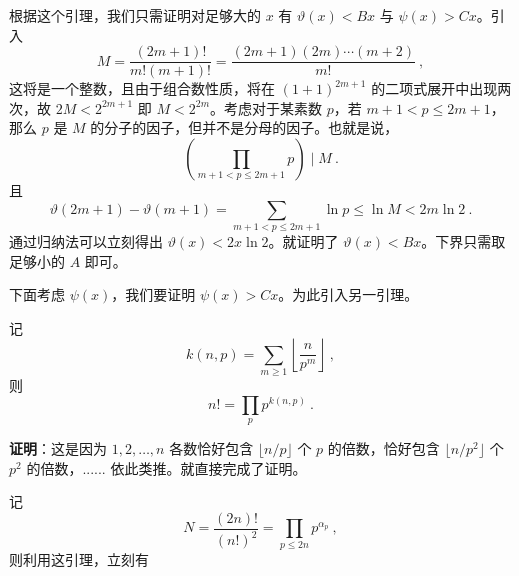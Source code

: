 根据这个引理，我们只需证明对足够大的 $x$ 有 $\vartheta(x) < Bx$ 与 $\psi(x) > Cx$。引入
\begin{equation}
M = \frac{(2m+1)!}{m! (m+1)!} = \frac{(2m+1)(2m)\cdots(m+2)}{m!} ~,
\end{equation}
这将是一个整数，且由于组合数性质，将在 $(1+1)^{2m+1}$ 的二项式展开中出现两次，故 $2M < 2^{2m+1}$ 即 $M < 2^{2m}$。考虑对于某素数 $p$，若 $m+1 < p \le 2m+1$，那么 $p$ 是 $M$ 的分子的因子，但并不是分母的因子。也就是说，
\begin{equation}
\left( \prod_{m+1 < p \le 2m+1} p \right) \mid M ~.
\end{equation}
且
\begin{equation}
\vartheta(2m+1) - \vartheta(m+1) = \sum_{m+1 < p \le 2m+1} \ln p \le \ln M < 2 m \ln 2 ~.
\end{equation}
通过归纳法可以立刻得出 $\vartheta(x) < 2x \ln 2$。就证明了 $\vartheta(x) < Bx$。下界只需取足够小的 $A$ 即可。

下面考虑 $\psi(x)$，我们要证明 $\psi(x) > Cx$。为此引入另一引理。
\begin{lemma}{}
记 
\begin{equation}
k(n, p) = \sum_{m\ge 1} \left\lfloor  \frac{n}{p^m} \right\rfloor ~,
\end{equation}
则
\begin{equation}
n! = \prod_p p^{k(n, p)} ~.
\end{equation}

\end{lemma}
\textbf{证明}：这是因为 $1, 2, \dots, n$ 各数恰好包含 $\lfloor n/p \rfloor$ 个 $p$ 的倍数，恰好包含 $ \lfloor n/p^2 \rfloor$ 个 $p^2$ 的倍数，...... 依此类推。就直接完成了证明。 

记 
\begin{equation}
N = \frac{(2n)!}{(n!)^2} = \prod_{p \le 2n} p^{\alpha_p} ~,
\end{equation}
则利用这引理，立刻有
\equ





